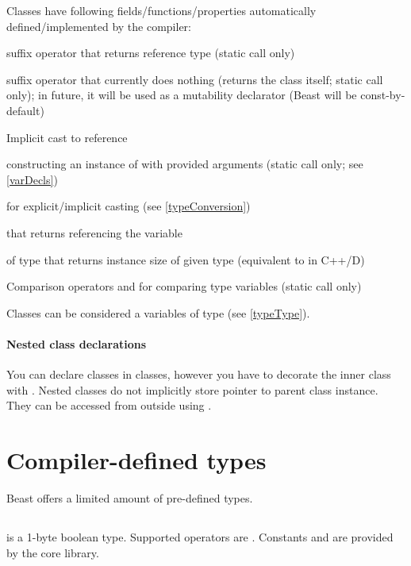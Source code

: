 Classes have following fields/functions/properties automatically defined/implemented by the compiler:
\begin{compactenum}
	\item {} suffix operator that returns reference type (static call only)
	\item {} suffix operator that currently does nothing (returns the class itself; static call only); in future, it will be used as a mutability declarator (Beast will be const-by-default)
	\item Implicit cast to reference
	\item {} constructing an instance of  with provided arguments (static call only; see \autoref{varDecls})
	\item {} for explicit/implicit casting (see \autoref{typeConversion})
	\item {} that returns  referencing the variable 
	\item {} of type  that returns instance size of given type (equivalent to  in C++/D)
	\item Comparison operators  and  for comparing type variables (static call only)
\end{compactenum}

Classes can be considered a \ctime variables of type  (see \autoref{typeType}).

\paragraph{Nested class declarations}
You can declare classes in classes, however you have to decorate the inner class with . Nested classes do not implicitly store pointer to parent class instance. They can be accessed from outside using .

\section{Compiler-defined types}
Beast offers a limited amount of pre-defined types.

\subsection{}
 is a 1-byte boolean type. Supported operators are \inlineCode{&& || == !=}. Constants  and  are provided by the core library.

